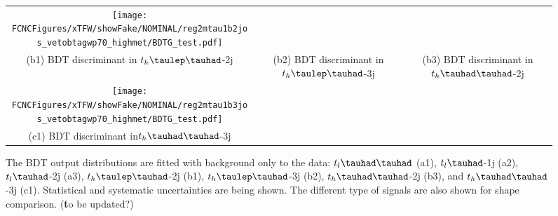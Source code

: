 \begin{figure}[H]
\begin{tabular}{@{}ccc@{}}
  \texttt{[image: \\FCNCFigures/xTFW/showFake/NOMINAL/reg2mtau1b2jos\_vetobtagwp70\_highmet/BDTG\_test.pdf]}\\
(b1) BDT discriminant in $t_h\tlhad$-2j & (b2) BDT discriminant in  $t_h\tlhad$-3j & (b3) BDT discriminant in $t_h\thadhad$-2j \\
  \texttt{[image: \\FCNCFigures/xTFW/showFake/NOMINAL/reg2mtau1b3jos\_vetobtagwp70\_highmet/BDTG\_test.pdf]}& \\
(c1) BDT discriminant in$t_h\thadhad$-3j\\
\end{tabular}
\caption{ The BDT output distributions are fitted with background only to the data: $t_l\thadhad$ (a1),  $t_l\tauhad$-1j (a2),  $t_l\tauhad$-2j (a3),
  $t_h\tlhad$-2j (b1), $t_h\tlhad$-3j (b2), $t_h\thadhad$-2j (b3), and $t_h\thadhad$-3j (c1).
  Statistical and systematic uncertainties are being shown. The different type of signals are also shown for shape comparison. ({\textbf to be updated?})}
\label{fig:Bonlyfit_data}
\end{figure}


